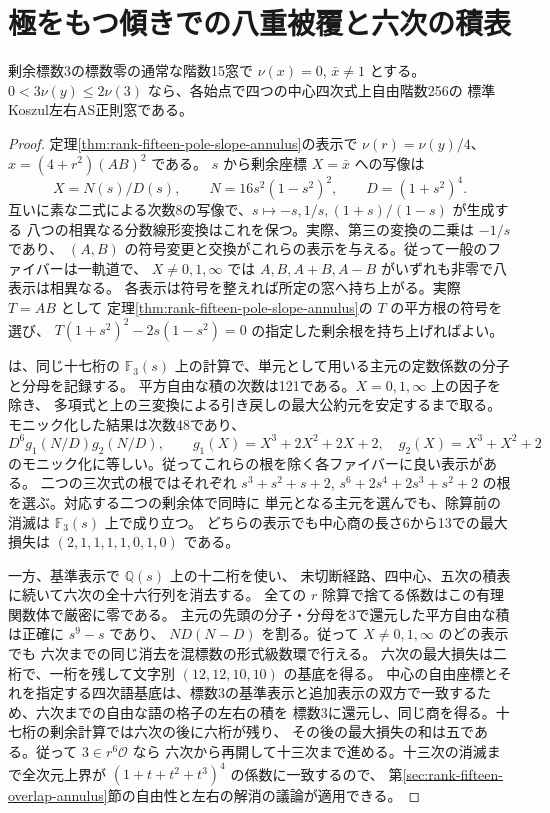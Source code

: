 \section{極をもつ傾きでの八重被覆と六次の積表}
\label{sec:rank-fifteen-pole-fibers}
\begin{theorem}\label{thm:rank-fifteen-pole-fibers}
剰余標数3の標数零の通常な階数15窓で $\nu(x)=0$, $\bar x\ne1$ とする。
$0<3\nu(y)\le2\nu(3)$ なら、各始点で四つの中心四次式上自由階数256の
標準Koszul左右AS正則窓である。

\end{theorem}
\begin{proof}
定理\ref{thm:rank-fifteen-pole-slope-annulus}の表示で
$\nu(r)=\nu(y)/4$、$x=(4+r^2)(AB)^2$ である。
$s$ から剰余座標 $X=\bar x$ への写像は
\[
  X=N(s)/D(s),\qquad N=16s^2(1-s^2)^2,\qquad D=(1+s^2)^4.
\]
互いに素な二式による次数8の写像で、$s\mapsto-s,1/s,(1+s)/(1-s)$ が生成する
八つの相異なる分数線形変換はこれを保つ。実際、第三の変換の二乗は $-1/s$ であり、
$(A,B)$ の符号変更と交換がこれらの表示を与える。従って一般のファイバーは一軌道で、
$X\ne0,1,\infty$ では $A,B,A+B,A-B$ がいずれも非零で八表示は相異なる。
各表示は符号を整えれば所定の窓へ持ち上がる。実際 $T=AB$ として
定理\ref{thm:rank-fifteen-pole-slope-annulus}の $T$ の平方根の符号を選び、
$T(1+s^2)^2-2s(1-s^2)=0$ の指定した剰余根を持ち上げればよい。

 は、同じ十七桁の
$\mathbb F_3(s)$ 上の計算で、単元として用いる主元の定数係数の分子と分母を記録する。
平方自由な積の次数は121である。$X=0,1,\infty$ 上の因子を除き、
多項式と上の三変換による引き戻しの最大公約元を安定するまで取る。
モニック化した結果は次数48であり、
\[
  D^6 g_1(N/D)g_2(N/D),\qquad
  g_1(X)=X^3+2X^2+2X+2,\quad g_2(X)=X^3+X^2+2
\]
のモニック化に等しい。従ってこれらの根を除く各ファイバーに良い表示がある。
二つの三次式の根ではそれぞれ $s^3+s^2+s+2$,
$s^6+2s^4+2s^3+s^2+2$ の根を選ぶ。対応する二つの剰余体で同時に
単元となる主元を選んでも、除算前の消滅は $\mathbb F_3(s)$ 上で成り立つ。
どちらの表示でも中心商の長さ6から13での最大損失は $(2,1,1,1,1,0,1,0)$ である。

一方、基準表示で $\mathbb Q(s)$ 上の十二桁を使い、
未切断経路、四中心、五次の積表に続いて六次の全十六行列を消去する。
全ての $r$ 除算で捨てる係数はこの有理関数体で厳密に零である。
主元の先頭の分子・分母を3で還元した平方自由な積は正確に $s^9-s$ であり、
$ND(N-D)$ を割る。従って $X\ne0,1,\infty$ のどの表示でも
六次までの同じ消去を混標数の形式級数環で行える。
六次の最大損失は二桁で、一桁を残して文字別 $(12,12,10,10)$ の基底を得る。
中心の自由座標とそれを指定する四次語基底は、標数3の基準表示と追加表示の双方で一致するため、六次までの自由な語の格子の左右の積を
標数3に還元し、同じ商を得る。十七桁の剰余計算では六次の後に六桁が残り、
その後の最大損失の和は五である。従って $3\in r^6\mathcal O$ なら
六次から再開して十三次まで進める。十三次の消滅まで全次元上界が $(1+t+t^2+t^3)^4$ の係数に一致するので、
第\ref{sec:rank-fifteen-overlap-annulus}節の自由性と左右の解消の議論が適用できる。
\end{proof}
